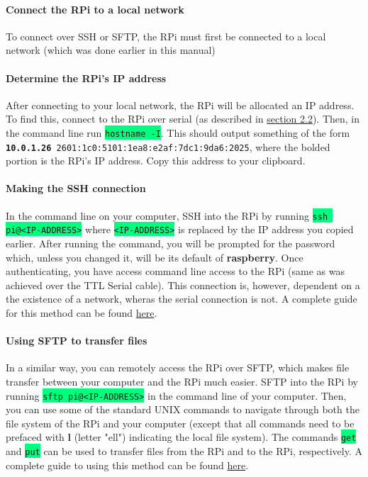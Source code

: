 \documentclass{article}
\newcommand{\codei}[1]{\colorbox{SpringGreen}{\texttt{#1}}} %
\newcommand{\outputi}[1]{\colorbox{light-gray}{\texttt{#1}}} %
\newcommand{\red}[1]{\textcolor{BrickRed}{#1}} %
\begin{document}
    \paragraph{Connect the RPi to a local network}
    To connect over SSH or SFTP, the RPi must first be connected to a local network (which was done earlier in this manual)
    \paragraph{Determine the RPi's IP address}
    After connecting to your local network, the RPi will be allocated an IP address. To find this, connect to the RPi over serial (as described in \hyperref[sec:connect-serial]{section 2.2}). Then, in the command line run \codei{hostname -I}. This should output something of the form \outputi{\red{\textbf{10.0.1.26} 2601:1c0:5101:1ea8:e2af:7dc1:9da6:2025}}, where the bolded portion is the RPi's IP address. Copy this address to your clipboard.
    \paragraph{Making the SSH connection}
    In the command line on your computer, SSH into the RPi by running \codei{ssh pi@\red{<IP-ADDRESS>}} where \codei{\red{<IP-ADDRESS>}} is replaced by the IP address you copied earlier. After running the command, you will be prompted for the password which, unless you changed it, will be its default of \textbf{raspberry}. Once authenticating, you have access command line access to the RPi (same as was achieved over the TTL Serial cable). This connection is, however, dependent on a the existence of a network, wheras the serial connection is not. A complete guide for this method can be found \href{https://www.raspberrypi.org/documentation/remote-access/ssh/}{here}.
    \paragraph{Using SFTP to transfer files}
    In a similar way, you can remotely access the RPi over SFTP, which makes file transfer between your computer and the RPi much easier. SFTP into the RPi by running \codei{sftp pi@\red{<IP-ADDRESS>}} in the command line of your computer. Then, you can use some of the standard UNIX commands to navigate through both the file system of the RPi and your computer (except that all commands need to be prefaced with \textbf{l} (letter "ell") indicating the local file system). The commands \codei{get} and \codei{put} can be used to transfer files from the RPi and to the RPi, respectively. A complete guide to using this method can be found \href{https://www.digitalocean.com/community/tutorials/how-to-use-sftp-to-securely-transfer-files-with-a-remote-server}{here}.
\end{document}
